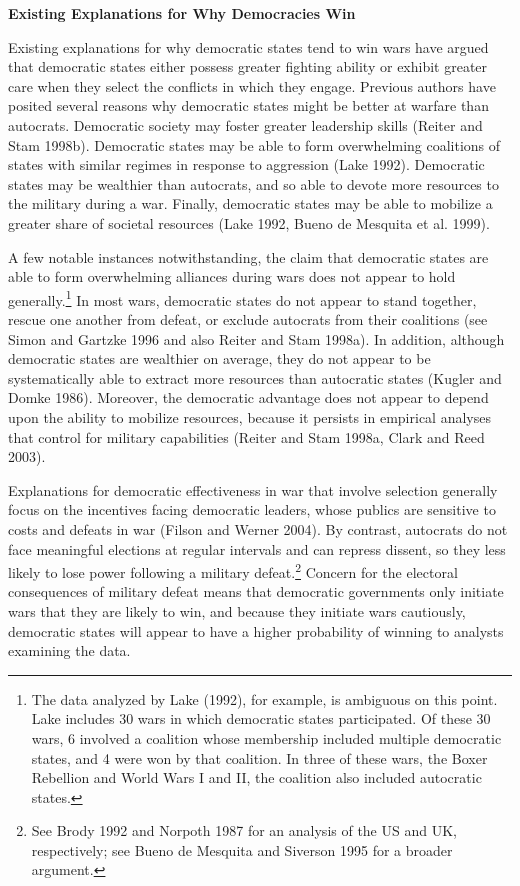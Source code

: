 \documentclass[11pt,]{article}
\begin{document}
\begin{center}
\textbf{\Large{Existing Explanations for Why Democracies Win}}\normalsize\\
\end{center}Existing explanations for why democratic states tend to win wars have argued that democratic states either possess greater fighting ability or exhibit greater care when they select the conflicts in which they engage.  Previous authors have posited several reasons why democratic states might be better at warfare than autocrats.  Democratic society may foster greater leadership skills (Reiter and Stam 1998b).  Democratic states may be able to form overwhelming coalitions of states with similar regimes in response to aggression (Lake 1992).  Democratic states may be wealthier than autocrats, and so able to devote more resources to the military during a war.  Finally, democratic states may be able to mobilize a greater share of societal resources (Lake 1992, Bueno de Mesquita et al. 1999).    %

A few notable instances notwithstanding, the claim that democratic states are able to form overwhelming alliances during wars does not appear to hold generally.\footnote{\normalsize\doublespacing The data analyzed by Lake (1992), for example, is ambiguous on this point.  Lake includes 30 wars in which democratic states participated.  Of these 30 wars, 6 involved a coalition whose membership included multiple democratic states, and 4 were won by that coalition.  In three of these wars, the Boxer Rebellion and World Wars I and II, the coalition also included autocratic states.}  In most wars, democratic states do not appear to stand together, rescue one another from defeat, or exclude autocrats from their coalitions (see Simon and Gartzke 1996 and also Reiter and Stam 1998a).  In addition, although democratic states are wealthier on average, they do not appear to be systematically able to extract more resources than autocratic states (Kugler and Domke 1986).  Moreover, the democratic advantage does not appear to depend upon the ability to mobilize resources, because it persists in empirical analyses that control for military capabilities (Reiter and Stam 1998a, Clark and Reed 2003).

Explanations for democratic effectiveness in war that involve selection generally focus on the incentives facing democratic leaders, whose publics are sensitive to costs and defeats in war (Filson and Werner 2004). By contrast, autocrats do not face meaningful elections at regular intervals and can repress dissent, so they less likely to lose power following a military defeat.\footnote{\normalsize\doublespacing See Brody 1992 and Norpoth 1987 for an analysis of the US and UK, respectively; see Bueno de Mesquita and Siverson 1995 for a broader argument.} Concern for the electoral consequences of military defeat means that democratic governments only initiate wars that they are likely to win, and because they initiate wars cautiously, democratic states will appear to have a higher probability of winning to analysts examining the data.
\end{document}
